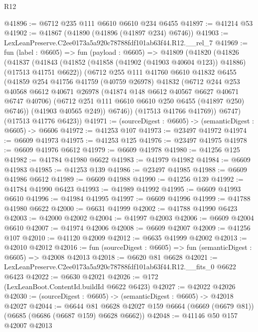 \begin{lexlean}{R12}
\begin{coremodule}
@41896 := @6712 @235 @111 @6610 @6610 @234 @6455
@41897 := @41214 @53
@41902 := @41867 (@41890 (@41896 (@41897 @234) @6746))
@41903 := LexLeanPreserve.C2ee0173a5a920c78788fdf101ab63f44.R12.__rel_7
@41969 := fun (label : @6605) =>
  fun (payload : @6605) =>
  @41809
    (@41820
      (@41826
        (@41837
          (@41843
            (@41852 (@41858 (@41902 (@41903 @40604 @123)) @41886) (@17513 @41751 @6622))
            (@6712
              @255
              @111
              @41760
              @6610
              @41832
              @6455
              (@41859
                @254
                @41756
                @41759
                (@40759 @26978)
                @41832
                (@6712
                  @244
                  @253
                  @40568
                  @6612
                  @40671
                  @26978
                  (@41874 @148 @6612 @40567 @6627 @40671 @6747 @40706)
                  (@6712 @251 @111 @6610 @6610 @250 @6455 (@41897 @250) @6746))
                (@41903 @40565 @249))
              @6746))
          (@17513 @41766 @41769))
        @6747)
      (@17513 @41776 @6423))
@41971 := (sourceDigest : @6605) -> (semanticDigest : @6605) -> @6606
@41972 := @41253 @107
@41973 := @23497 @41972
@41974 := @6609 @41973
@41975 := @41253 @125
@41976 := @23497 @41975
@41978 := @6609 @41976 @6612
@41979 := @6609 @41978
@41980 := @41256 @125
@41982 := @41784 @41980 @6622
@41983 := @41979 @41982
@41984 := @6609 @41983
@41985 := @41253 @139
@41986 := @23497 @41985
@41988 := @6609 @41986 @6612
@41989 := @6609 @41988
@41990 := @41256 @139
@41992 := @41784 @41990 @6423
@41993 := @41989 @41992
@41995 := @6609 @41993 @6610
@41996 := @41984 @41995
@41997 := @6609 @41996
@41999 := @41788 @41980 @6622
@42000 := @6631 @41999
@42002 := @41788 @41990 @6423
@42003 := @42000 @42002
@42004 := @41997 @42003
@42006 := @6609 @42004 @6610
@42007 := @41974 @42006
@42008 := @6609 @42007
@42009 := @41256 @107
@42010 := @41120 @42009
@42012 := @6635 @41999 @42002
@42013 := @42010 @42012
@42016 := fun (sourceDigest : @6605) => fun (semanticDigest : @6605) => @42008 @42013
@42018 := @6620 @81 @6628
@42021 := LexLeanPreserve.C2ee0173a5a920c78788fdf101ab63f44.R12.__fits_0 @6622 @6423
@42022 := @6630 @42021
@42026 := @172 (LexLeanBoot.ContentId.buildId @6622 @6423)
@42027 := @42022 @42026
@42030 := (sourceDigest : @6605) -> (semanticDigest : @6605) -> @42018 @42027
@42044 := @6644
    @81
    @6628
    @42027
    @159
    @6664
    (@6669 (@6679 @81))
    (@6685 (@6686 (@6687 @159) @6628 @6662))
@42048 := @41146 @50 @157 @42007 @42013

\end{coremodule}
\end{lexlean}
